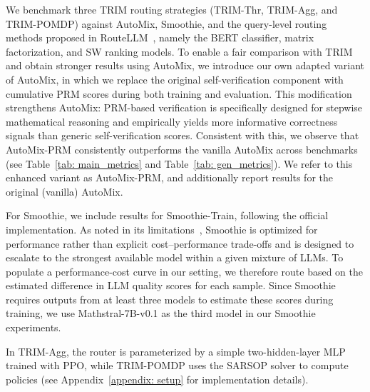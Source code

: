 \documentclass{article}
\theoremstyle{plain}
\theoremstyle{definition}
\theoremstyle{remark}
\begin{document}
We benchmark three TRIM routing strategies (TRIM-Thr, TRIM-Agg, and TRIM-POMDP) against AutoMix, Smoothie, and the query-level routing methods proposed in RouteLLM~\citep{routellm}, namely the BERT classifier, matrix factorization, and SW ranking models. To enable a fair comparison with TRIM and obtain stronger results using AutoMix, we introduce our own adapted variant of AutoMix, in which we replace the original self-verification component with cumulative PRM scores during both training and evaluation. This modification strengthens AutoMix: PRM-based verification is specifically designed for stepwise mathematical reasoning and empirically yields more informative correctness signals than generic self-verification scores. Consistent with this, we observe that AutoMix-PRM consistently outperforms the vanilla AutoMix across benchmarks (see Table~\ref{tab: main_metrics} and Table~\ref{tab: gen_metrics}).
We refer to this enhanced variant as AutoMix-PRM, and additionally report results for the original (vanilla) AutoMix. 

For Smoothie, we include results for Smoothie-Train, following the official implementation. As noted in its limitations~\citep{smoothie}, Smoothie is optimized for performance rather than explicit cost–performance trade-offs and is designed to escalate to the strongest available model within a given mixture of LLMs. To populate a performance-cost curve in our setting, we therefore route based on the estimated difference in LLM quality scores for each sample. Since Smoothie requires outputs from at least three models to estimate these scores during training, we use Mathstral-7B-v0.1 as the third model in our Smoothie experiments.


In TRIM-Agg, the router is parameterized by a simple two-hidden-layer MLP trained with PPO, while TRIM-POMDP uses the SARSOP solver \citep{sarsop} to compute policies (see Appendix~\ref{appendix: setup} for implementation details).
\end{document}
